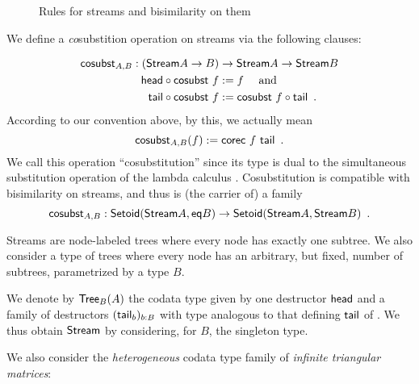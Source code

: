 \documentclass[a4paper,USenglish]{lipics}
\newcommand{\parencite}[1]{\cite{#1}}
\begin{document}
\begin{ex}
\begin{figure}
 \begin{mdframed}
  
 \end{mdframed}
 \caption{Rules for streams and bisimilarity on them} \label{stream_rules}
\end{figure}

  
  We define a \emph{co}substition operation  on streams via the following clauses:
    
   \begin{align*} 
                  \sredec_{A,B} : (\stream A \to B) &\to \stream A\to\stream B \\
                  \comp{\sredec~f}{\shead} &:= f \quad\text{ and } \quad \\
                  \comp{\sredec~f}{\stail} &:= \comp{\stail}{\sredec~f} \enspace . %
    \end{align*}
  According to our convention above, by this, we actually mean
  \[  \mathsf{cosubst}_{A,B}(f) := \mathsf{corec}~f~\mathsf{tail} \enspace . \]
  We call this operation \enquote{cosubstitution} since its type is dual to the simultaneous substitution operation 
  of the lambda calculus \parencite{alt_reus}. 
  Cosubstitution is compatible with bisimilarity on streams, and thus is (the carrier of) a family
  \[ \mathsf{cosubst}_{A,B} : \mathsf{Setoid}(\mathsf{Stream} A, \mathsf{eq} B) \to \mathsf{Setoid}(\mathsf{Stream} A,\mathsf{Stream} B) \enspace . \]

\end{ex}


\noindent
Streams are node-labeled trees where every node has exactly one subtree.
We also consider a type of trees where every node has an arbitrary, but fixed, number of subtrees, 
parametrized by a type $B$.



\begin{ex}\label{ex_trees}
 We denote by $\mathsf{Tree}_B(A)$ the codata type given by one destructor $\mathsf{head}$ and a family of 
 destructors $(\mathsf{tail}_b)_{b:B}$ with type analogous to that defining $\mathsf{tail}$ of .
 We thus obtain $\mathsf{Stream}$ by considering, for $B$, the singleton type.
\end{ex}


We also consider the \emph{heterogeneous} codata type family of \emph{infinite triangular matrices}:
\end{document}
